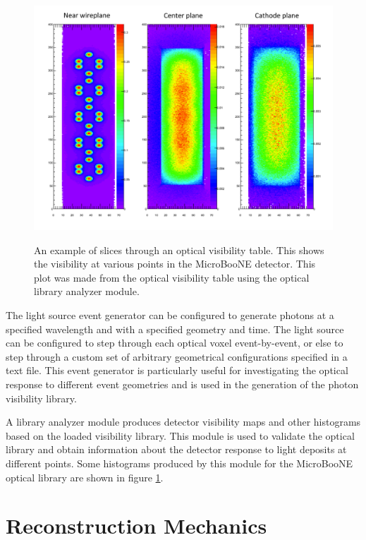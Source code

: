 \documentclass[12pt]{elsarticle}
\begin{document}
\begin{figure}[h]
\centering
\caption{An example of slices through an optical visibility table. This shows the visibility at various points
in the MicroBooNE detector.  This plot was made from the optical visibility table using the optical library
analyzer module.}
\includegraphics[width=6.0in]{./mtrls/imgs/SampleOpticalMap.pdf}
\label{fig:opticalmap}
\end{figure}

The light source event generator can be configured to generate photons at a specified wavelength and with a specified geometry and time.  The light source can be configured to step through each optical voxel event-by-event, or else to step through a custom set of arbitrary geometrical configurations specified in a text file.  This event generator is particularly useful for investigating the optical response to different event geometries and is used in the generation of the photon visibility library.

A library analyzer module produces detector visibility maps and other histograms based on the loaded visibility library.  This module is used to validate the optical library and obtain information about the detector response to light deposits at different points.  Some histograms produced by this module for the MicroBooNE optical library are shown in figure \ref{fig:opticalmap}.


\section{Reconstruction Mechanics}
\end{document}
